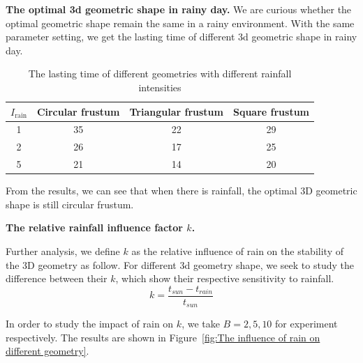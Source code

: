 \documentclass{mcmthesis}		    %
\begin{document}
    \textbf{The optimal 3d geometric shape in rainy day. }We are curious whether the optimal geometric shape remain the same in a rainy environment. With the same parameter setting, we get the lasting time of different 3d geometric shape in rainy day. 
    \begin{table}[htbp!]
    \centering
	\caption{The lasting time of different geometries with different rainfall intensities}
	\label{tab:Duration of different geometries under different rainfall intensities}
    \begin{tabular}{|c|c|c|c|}
    \hline
    $I_{\text{rain}}$ & Circular frustum  & Triangular frustum   & Square frustum   \\ \hline
    1 & 35 & 22 & 29 \\ \hline
    2 & 26 & 17 & 25 \\ \hline
    5 & 21 & 14 & 20 \\ \hline
   \end{tabular}
   \end{table}
 
    From the results, we can see that when there is rainfall, the optimal 3D geometric shape is still circular frustum. 
    
    \textbf{The relative rainfall influence factor $k$. }
    
    Further analysis, we define $k$ as the relative influence of rain on the stability of the 3D geometry as follow. For different 3d geometry shape, we seek to study the difference between their $k$, which show their respective sensitivity to rainfall. 
    \begin{equation}
    	k=\frac{t_{sun}-t_{rain}}{t_{sun}}
    \end{equation} 
    
    In order to study the impact of rain on $k$, we take $B=2,5,10$ for experiment respectively. The results are shown in Figure~\ref{fig:The influence of rain on different geometry}.
 
\end{document}
